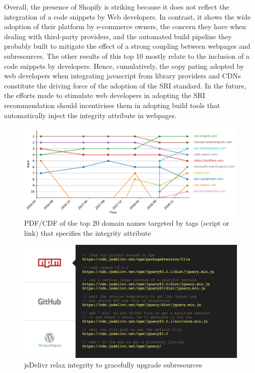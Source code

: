 \documentclass[sigconf,table]{acmart}
\begin{document}
Overall, the presence of Shopify is striking because it does not reflect the integration of a code snippets by Web developers. 
In contrast, it shows the wide adoption of their platform by e-commerce owners, the concern they have when dealing with third-party providers, and the automated build pipeline they probably built to mitigate the effect of a strong coupling between webpages and subresources.
The other results of this top 10 mostly relate to the inclusion of a code snippets by developers. 
Hence, cumulatively, the copy pating adopted by web developers when integrating javascript from library providers and CDNs constitute the driving force of the adoption of the SRI standard.
In the future, the efforts made to stimulate web developers in adopting the SRI recommendation should incentivises them in adopting build tools that automatically inject the integrity attribute in webpages.

\begin{figure}[h]
	\includegraphics[width=1.6\columnwidth]{../../notebooks/08_topk_evolution}
	\caption{PDF/CDF of the top 20 domain names targeted by tags (script or link) that specifies the integrity attribute}
	\label{fig:08}
\end{figure}

\begin{figure}[h]
	\includegraphics[width=\columnwidth]{figures/jsdelivr}
	\caption{jsDelivr relax integrity to gracefully upgrade subresources}
	\label{fig:jsdelivr}
\end{figure}
\end{document}
